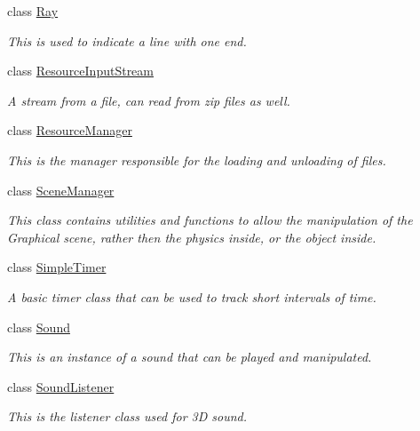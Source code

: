 \begin{DoxyCompactItemize}
class \hyperlink{classphys_1_1Ray}{Ray}
\begin{DoxyCompactList}\small\item\em This is used to indicate a line with one end. \item\end{DoxyCompactList}\item 
class \hyperlink{classphys_1_1ResourceInputStream}{ResourceInputStream}
\begin{DoxyCompactList}\small\item\em A stream from a file, can read from zip files as well. \item\end{DoxyCompactList}\item 
class \hyperlink{classphys_1_1ResourceManager}{ResourceManager}
\begin{DoxyCompactList}\small\item\em This is the manager responsible for the loading and unloading of files. \item\end{DoxyCompactList}\item 
class \hyperlink{classphys_1_1SceneManager}{SceneManager}
\begin{DoxyCompactList}\small\item\em This class contains utilities and functions to allow the manipulation of the Graphical scene, rather then the physics inside, or the object inside. \item\end{DoxyCompactList}\item 
class \hyperlink{classphys_1_1SimpleTimer}{SimpleTimer}
\begin{DoxyCompactList}\small\item\em A basic timer class that can be used to track short intervals of time. \item\end{DoxyCompactList}\item 
class \hyperlink{classphys_1_1Sound}{Sound}
\begin{DoxyCompactList}\small\item\em This is an instance of a sound that can be played and manipulated. \item\end{DoxyCompactList}\item 
class \hyperlink{classphys_1_1SoundListener}{SoundListener}
\begin{DoxyCompactList}\small\item\em This is the listener class used for 3D sound. \item\end{DoxyCompactList}\item 

\end{DoxyCompactItemize}
